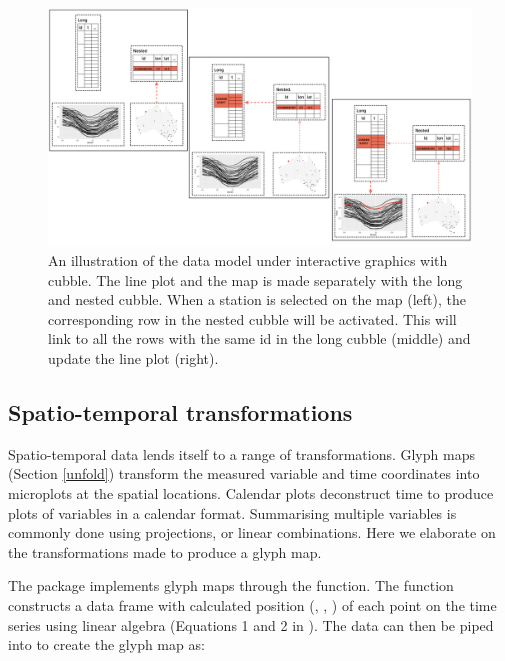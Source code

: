 \documentclass[
]{jss}
\begin{document}
\begin{CodeChunk}
\begin{figure}

{\centering \includegraphics[width=1\linewidth,height=0.4\textheight]{../figures/diagram-keynotes/diagram-keynotes.004} 

}

\caption[An illustration of the data model under interactive graphics with cubble]{An illustration of the data model under interactive graphics with cubble. The line plot and the map is made separately with the long and nested cubble. When a station is selected on the map (left), the corresponding row in the nested cubble will be activated. This will link to all the rows with the same id in the long cubble (middle) and update the line plot (right).}\label{fig:illu-interactive}
\end{figure}
\end{CodeChunk}

\hypertarget{st_transformation}{%
\subsection{Spatio-temporal transformations}\label{st_transformation}}

Spatio-temporal data lends itself to a range of transformations. Glyph maps (Section \ref{unfold}) transform the measured variable and time coordinates into microplots at the spatial locations. Calendar plots \citep{wang2020calendar} deconstruct time to produce plots of variables in a calendar format. Summarising multiple variables is commonly done using projections, or linear combinations. Here we elaborate on the transformations made to produce a glyph map.

The  package  implements glyph maps through the  function. The function constructs a data frame with calculated position (, , ) of each point on the time series using linear algebra (Equations 1 and 2 in \citet{Wickham2012-yr}). The data can then be piped into  to create the glyph map as:
\end{document}
